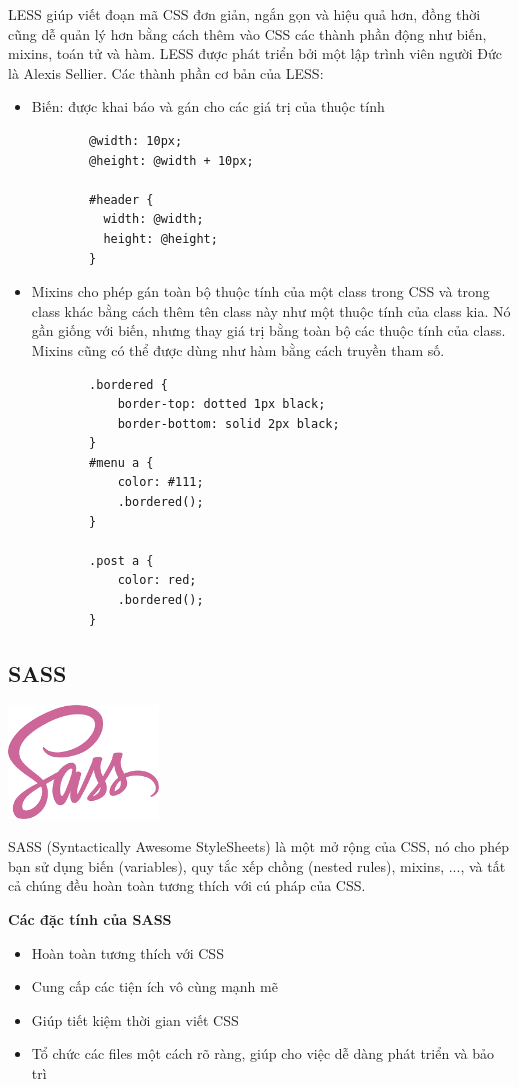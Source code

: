 LESS giúp viết đoạn mã CSS đơn giản, ngắn gọn và hiệu quả hơn, đồng thời cũng dễ quản lý hơn bằng cách thêm vào CSS các thành phần động như biến, mixins, toán tử và hàm. LESS được phát triển bởi một lập trình viên người Đức là Alexis Sellier. Các thành phần cơ bản của LESS:
\begin{itemize}
    \item Biến: được khai báo và gán cho các giá trị của thuộc tính
    \begin{verbatim}
        @width: 10px;
        @height: @width + 10px;

        #header {
          width: @width;
          height: @height;
        }
    \end{verbatim}
    \item Mixins cho phép gán toàn bộ thuộc tính của một class trong CSS và trong class khác bằng cách thêm tên class này như một thuộc tính của class kia. Nó gần giống với biến, nhưng thay giá trị bằng toàn bộ các thuộc tính của class. Mixins cũng có thể được dùng như hàm bằng cách truyền tham số.
    \begin{verbatim}
        .bordered {
            border-top: dotted 1px black;
            border-bottom: solid 2px black;
        }
        #menu a {
            color: #111;
            .bordered();
        }
        
        .post a {
            color: red;
            .bordered();
        }
    \end{verbatim}
\end{itemize}
\subsection{SASS}
\begin{center}
  \captionsetup{type=figure}
  \includegraphics[width=4cm]{img/sass-logo.png}
\end{center}

SASS (Syntactically Awesome StyleSheets) là một mở rộng của CSS, nó cho phép bạn sử dụng biến (variables), quy tắc xếp chồng (nested rules), mixins, ..., và tất cả chúng đều hoàn toàn tương thích với cú pháp của CSS.

\textbf{Các đặc tính của SASS}
\begin{itemize}
    \item Hoàn toàn tương thích với CSS
    \item Cung cấp các tiện ích vô cùng mạnh mẽ
    \item Giúp tiết kiệm thời gian viết CSS
    \item Tổ chức các files một cách rõ ràng, giúp cho việc dễ dàng phát triển và bảo trì
\end{itemize}

